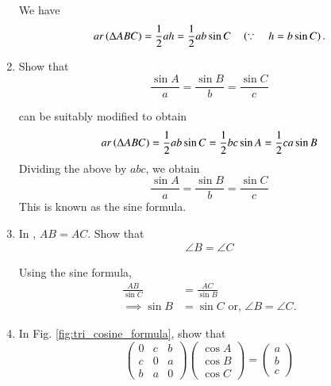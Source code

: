 \begin{enumerate}[label=\thesubsection.\arabic*.,ref=\thesubsection.\theenumi]
\solution We have
%
\begin{equation}
ar\left(\Delta ABC\right) = \frac{1}{2}ah = \frac{1}{2}ab\sin C \quad \left(\because \quad h = b \sin C\right).
\label{eq:tri_area_sin}
\end{equation}

\item
	Show that 
	\begin{equation}
	\frac{\sin A}{a} = \frac{\sin B}{b} = \frac{\sin C}{c}
	\end{equation}

\solution 
{} can be suitably modified to obtain 
\begin{align}
ar\left(\Delta ABC\right) = 
\frac{1}{2}ab\sin C = \frac{1}{2}bc\sin A = \frac{1}{2}ca\sin B
	\label{tri:area-sin}
\end{align}
Dividing the above by $abc$, we obtain
	\begin{equation}
\label{eq:tri_sin_form}
	\frac{\sin A}{a} = \frac{\sin B}{b} = \frac{\sin C}{c}
	\end{equation}
This is known as the sine formula.	
%
\item 
	In , $AB = AC$.  Show that 
\begin{align}
	\angle B
	= \angle C 
\end{align}
\begin{figure}[H]
	\centering
		\resizebox{0.6\columnwidth}{!}{}
	\caption{}
	\label{fig:tri_isoc}
\end{figure}
\solution Using the sine formula, 
\begin{align}
	\frac{AB}{\sin C}
	&=\frac{AC}{\sin B}
	\\
	\implies \sin B &= \sin C
	\text{ or, } \angle B = \angle C.
\end{align}
\item
In Fig. \ref{fig:tri_cosine_formula}, show that
%
\begin{equation}
\label{eq:tri_cos_mat}
\begin{pmatrix}
0 & c & b \\
c & 0 & a \\
b & a & 0
\end{pmatrix}
\begin{pmatrix}
\cos A \\
\cos B \\
\cos C
\end{pmatrix}
= 
\begin{pmatrix}
a\\
b\\
c
\end{pmatrix}
\end{equation}
%
%
\begin{figure}[!ht]
	\begin{center}
		

\end{center}
\end{figure}
\end{enumerate}
